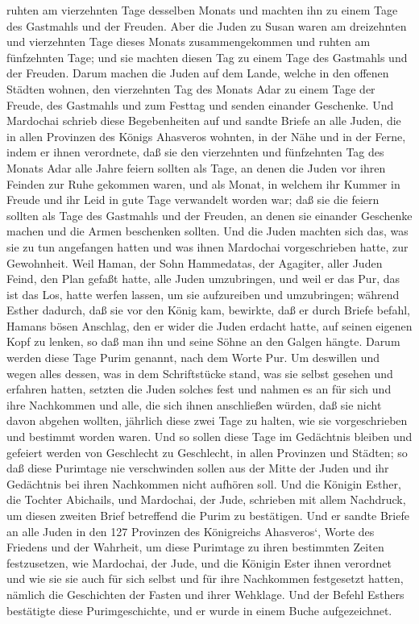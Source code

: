 ruhten am vierzehnten Tage desselben Monats und machten ihn zu einem
Tage des Gastmahls und der Freuden.  Aber die Juden zu
Susan waren am dreizehnten und vierzehnten Tage dieses Monats
zusammengekommen und ruhten am fünfzehnten Tage; und sie machten diesen
Tag zu einem Tage des Gastmahls und der Freuden.  Darum
machen die Juden auf dem Lande, welche in den offenen Städten wohnen,
den vierzehnten Tag des Monats Adar zu einem Tage der Freude, des
Gastmahls und zum Festtag und senden einander Geschenke. 
Und Mardochai schrieb diese Begebenheiten auf und sandte Briefe an alle
Juden, die in allen Provinzen des Königs Ahasveros wohnten, in der Nähe
und in der Ferne,  indem er ihnen verordnete, daß sie den
vierzehnten und fünfzehnten Tag des Monats Adar alle Jahre feiern
sollten als Tage,  an denen die Juden vor ihren Feinden
zur Ruhe gekommen waren, und als Monat, in welchem ihr Kummer in Freude
und ihr Leid in gute Tage verwandelt worden war; daß sie die feiern
sollten als Tage des Gastmahls und der Freuden, an denen sie einander
Geschenke machen und die Armen beschenken sollten.  Und
die Juden machten sich das, was sie zu tun angefangen hatten und was
ihnen Mardochai vorgeschrieben hatte, zur Gewohnheit. 
Weil Haman, der Sohn Hammedatas, der Agagiter, aller Juden Feind, den
Plan gefaßt hatte, alle Juden umzubringen, und weil er das Pur, das ist
das Los, hatte werfen lassen, um sie aufzureiben und umzubringen;
 während Esther dadurch, daß sie vor den König kam,
bewirkte, daß er durch Briefe befahl, Hamans bösen Anschlag, den er
wider die Juden erdacht hatte, auf seinen eigenen Kopf zu lenken, so daß
man ihn und seine Söhne an den Galgen hängte.  Darum
werden diese Tage Purim genannt, nach dem Worte Pur. Um deswillen und
wegen alles dessen, was in dem Schriftstücke stand, was sie selbst
gesehen und erfahren hatten,  setzten die Juden solches
fest und nahmen es an für sich und ihre Nachkommen und alle, die sich
ihnen anschließen würden, daß sie nicht davon abgehen wollten, jährlich
diese zwei Tage zu halten, wie sie vorgeschrieben und bestimmt worden
waren.  Und so sollen diese Tage im Gedächtnis bleiben
und gefeiert werden von Geschlecht zu Geschlecht, in allen Provinzen und
Städten; so daß diese Purimtage nie verschwinden sollen aus der Mitte
der Juden und ihr Gedächtnis bei ihren Nachkommen nicht aufhören soll.
 Und die Königin Esther, die Tochter Abichails, und
Mardochai, der Jude, schrieben mit allem Nachdruck, um diesen zweiten
Brief betreffend die Purim zu bestätigen.  Und er sandte
Briefe an alle Juden in den 127 Provinzen des Königreichs Ahasveros`,
Worte des Friedens und der Wahrheit,  um diese Purimtage
zu ihren bestimmten Zeiten festzusetzen, wie Mardochai, der Jude, und
die Königin Ester ihnen verordnet und wie sie sie auch für sich selbst
und für ihre Nachkommen festgesetzt hatten, nämlich die Geschichten der
Fasten und ihrer Wehklage.  Und der Befehl Esthers
bestätigte diese Purimgeschichte, und er wurde in einem Buche
aufgezeichnet.

